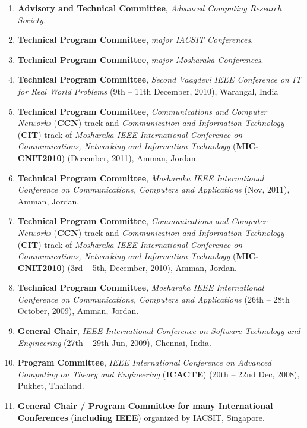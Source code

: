 \begin{enumerate} [label=(\arabic*).]
\item
\textbf{Advisory and Technical Committee}, \textit{Advanced Computing Research Society.}

\item
\textbf{Technical Program Committee}, \textit{major IACSIT Conferences}.

\item
\textbf{Technical Program Committee}, \textit{major Mosharaka Conferences}.

\item
\textbf{Technical Program Committee}, \textit{Second Vaagdevi IEEE Conference on IT for Real World Problems} (9th – 11th December, 2010), Warangal, India

\item
\textbf{Technical Program Committee}, \textit{Communications and Computer Networks} (\textbf{CCN}) track and \textit{Communication and Information Technology} (\textbf{CIT}) track of\textit{ Mosharaka IEEE International Conference on Communications, Networking and Information Technology} (\textbf{MIC-CNIT2010}) (December, 2011), Amman, Jordan.

\item
\textbf{Technical Program Committee}, \textit{Mosharaka IEEE International Conference on Communications, Computers and Applications} (Nov, 2011), Amman, Jordan.

\item
\textbf{Technical Program Committee}, \textit{Communications and Computer Networks} (\textbf{CCN}) track and \textit{Communication and Information Technology} (\textbf{CIT}) track of \textit{Mosharaka IEEE International Conference on Communications, Networking and Information Technology} (\textbf{MIC-CNIT2010}) (3rd – 5th, December, 2010), Amman, Jordan.

\item
\textbf{Technical Program Committee}, \textit{Mosharaka IEEE International Conference on Communications, Computers and Applications} (26th – 28th October, 2009), Amman, Jordan.

\item
\textbf{General Chair}, \textit{IEEE International Conference on Software Technology and Engineering} (27th – 29th Jun, 2009), Chennai, India.

\item 
\textbf{Program Committee},\textit{ IEEE International Conference on Advanced Computing on Theory and Engineering} (\textbf{ICACTE}) (20th – 22nd Dec, 2008), Pukhet, Thailand. 

\item
\textbf{General Chair / Program Committee for many International Conferences} (\textbf{including IEEE}) organized by IACSIT, Singapore.

\end{enumerate}